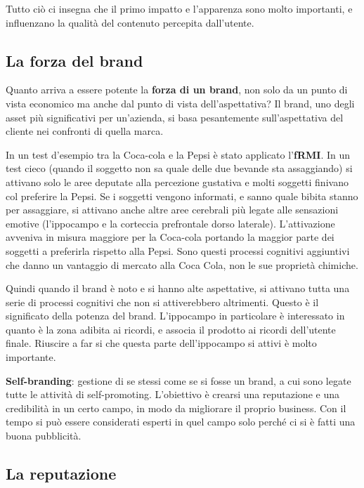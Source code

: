 Tutto ciò ci insegna che il primo impatto e l'apparenza sono molto importanti,
e influenzano la qualità del contenuto percepita dall'utente.

\subsection{La forza del brand}

Quanto arriva a essere potente la \textbf{forza di un brand}, non solo da un
punto di vista economico ma anche dal punto di vista dell'aspettativa?
Il brand, uno degli asset più significativi per un'azienda, si basa
pesantemente sull'aspettativa del cliente nei confronti di quella marca.

In un test d'esempio tra la Coca-cola e la Pepsi è stato applicato
l'\textbf{fRMI}.
In un test cieco (quando il soggetto non sa quale delle due bevande sta
assaggiando) si attivano solo le aree deputate alla percezione gustativa e
molti soggetti finivano col preferire la Pepsi. Se i soggetti vengono
informati, e sanno quale bibita stanno per assaggiare, si attivano anche altre
aree cerebrali più legate alle sensazioni emotive (l'ippocampo e la corteccia
prefrontale dorso laterale). L'attivazione avveniva in misura maggiore per la
Coca-cola portando la maggior parte dei soggetti a preferirla rispetto alla
Pepsi.
Sono questi processi cognitivi aggiuntivi che danno un vantaggio di mercato
alla Coca Cola, non le sue proprietà chimiche.

Quindi quando il brand è noto e si hanno alte aspettative, si attivano tutta
una serie di processi cognitivi che non si attiverebbero altrimenti. Questo è
il significato della potenza del brand. L'ippocampo in particolare è
interessato in quanto è la zona adibita ai ricordi, e associa il prodotto ai
ricordi dell'utente finale. Riuscire a far si che questa parte dell'ippocampo
si attivi è molto importante.

\textbf{Self-branding}: gestione di se stessi come se si fosse un brand, a cui
sono legate tutte le attività di self-promoting. L'obiettivo è crearsi una 
reputazione e una credibilità in un certo campo, in modo da migliorare il
proprio business. Con il tempo si può essere considerati esperti in quel
campo solo perché ci si è fatti una buona pubblicità.

\subsection{La reputazione}

